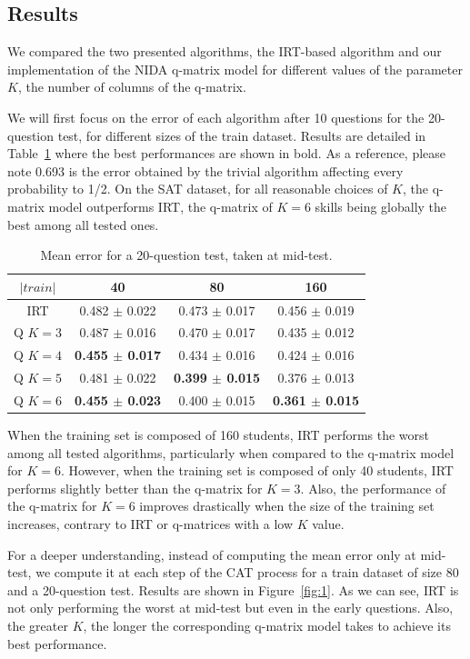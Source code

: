 \documentclass{sig-alternate}
\begin{document}
\subsection{Results}

We compared the two presented algorithms, the IRT-based algorithm and our implementation of the NIDA q-matrix model for different values of the parameter $K$, the number of columns of the q-matrix.

We will first focus on the error of each algorithm after 10 questions for the 20-question test, for different sizes of the train dataset. Results are detailed in Table~\ref{tab:20q} where the best performances are shown in bold. As a reference, please note 0.693 is the error obtained by the trivial algorithm affecting every probability to 1/2. On the SAT dataset, for all reasonable choices of $K$, the q-matrix model outperforms IRT, the q-matrix of $K = 6$ skills being globally the best among all tested ones.

\begin{table}[H]
\small\centering\begin{tabular}{@{}cccc@{}}
$|train|$ & 40 & 80 & 160\\
\hline
IRT & 0.482 $\pm$ 0.022 & 0.473 $\pm$ 0.017 & 0.456 $\pm$ 0.019\\
Q $K = 3$ & 0.487 $\pm$ 0.016 & 0.470 $\pm$ 0.017 & 0.435 $\pm$ 0.012\\
Q $K = 4$ & \textbf{0.455 $\pm$ 0.017} & 0.434 $\pm$ 0.016 & 0.424 $\pm$ 0.016\\
Q $K = 5$ & 0.481 $\pm$ 0.022 & \textbf{0.399 $\pm$ 0.015} & 0.376 $\pm$ 0.013\\
Q $K = 6$ & \textbf{0.455 $\pm$ 0.023} & 0.400 $\pm$ 0.015 & \textbf{0.361 $\pm$ 0.015}\\
\end{tabular}
\caption{Mean error for a 20-question test, taken at mid-test.}
\label{tab:20q}
\end{table}

When the training set is composed of 160 students, IRT performs the worst among all tested algorithms, particularly when compared to the q-matrix model for $K = 6$. However, when the training set is composed of only 40 students, IRT performs slightly better than the q-matrix for $K = 3$. Also, the performance of the q-matrix for $K = 6$ improves drastically when the size of the training set increases, contrary to IRT or q-matrices with a low $K$ value.

For a deeper understanding, instead of computing the mean error only at mid-test, we compute it at each step of the CAT process for a train dataset of size 80 and a 20-question test. Results are shown in Figure~\ref{fig:1}. As we can see, IRT is not only performing the worst at mid-test but even in the early questions. Also, the greater $K$, the longer the corresponding q-matrix model takes to achieve its best performance.
\end{document}
